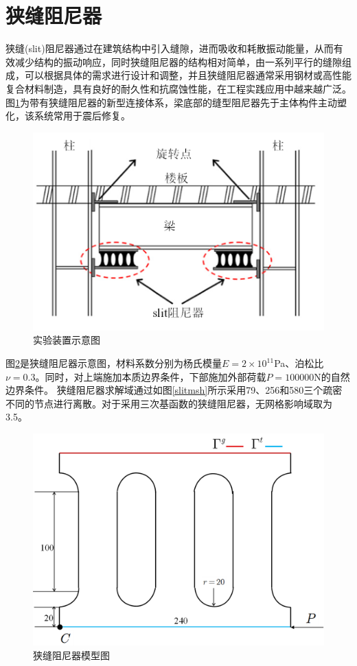 \section{狭缝阻尼器}
狭缝(slit)阻尼器通过在建筑结构中引入缝隙，进而吸收和耗散振动能量，从而有效减少结构的振动响应，同时狭缝阻尼器的结构相对简单，由一系列平行的缝隙组成，可以根据具体的需求进行设计和调整，并且狭缝阻尼器通常采用钢材或高性能复合材料制造，具有良好的耐久性和抗腐蚀性能，在工程实践应用中越来越广泛。
图\ref{slit1}为带有狭缝阻尼器的新型连接体系，梁底部的缝型阻尼器先于主体构件主动塑化，该系统常用于震后修复。
\begin{figure}[H]
    \centering
    \includegraphics[scale=0.7]{figure/DAMPER/SLIT/1.png}
    \caption{实验装置示意图\cite{oh2009}}\label{slit1}
\end{figure}
图\ref{slit2}是狭缝阻尼器示意图，材料系数分别为杨氏模量$E=2\times 10^{11}$Pa、泊松比$\nu=0.3$。同时，对上端施加本质边界条件，下部施加外部荷载$P=100000$N的自然边界条件。
狭缝阻尼器求解域通过如图\ref{slitmsh}所示采用79、256和580三个疏密不同的节点进行离散。对于采用三次基函数的狭缝阻尼器，无网格影响域取为3.5。
\newpage
\begin{figure}[H]
    \centering
    \includegraphics[scale=0.5]{figure/DAMPER/SLIT/2.png}
    \caption{狭缝阻尼器模型图}\label{slit2}
\end{figure}
